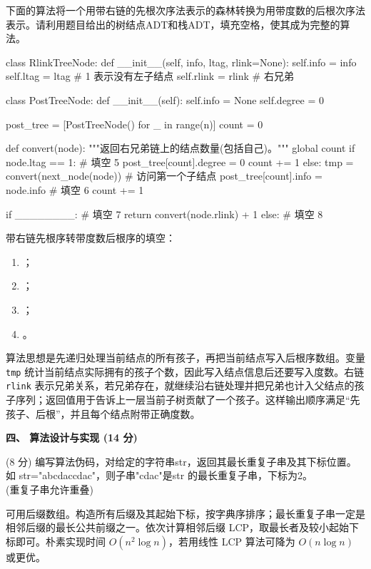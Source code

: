 \begin{question}
下面的算法将一个用带右链的先根次序法表示的森林转换为用带度数的后根次序法表示。请利用题目给出的树结点ADT和栈ADT，填充空格，使其成为完整的算法。\\
\begin{pycode}
class RlinkTreeNode:
    def __init__(self, info, ltag, rlink=None):
        self.info = info
        self.ltag = ltag       # 1 表示没有左子结点
        self.rlink = rlink     # 右兄弟


class PostTreeNode:
    def __init__(self):
        self.info = None
        self.degree = 0


post_tree = [PostTreeNode() for _ in range(n)]
count = 0


def convert(node):
    """返回右兄弟链上的结点数量(包括自己)。"""
    global count
    if node.ltag == 1:
        # 填空 5
        post_tree[count].degree = 0
        count += 1
    else:
        tmp = convert(next_node(node))   # 访问第一个子结点
        post_tree[count].info = node.info
        # 填空 6
        count += 1

    if ________:                         # 填空 7
        return convert(node.rlink) + 1
    else:
        # 填空 8
\end{pycode}
\begin{solution}
带右链先根序转带度数后根序的填空：
  \begin{enumerate}[leftmargin=2em]
    \item \texttt{}；
    \item \texttt{}；
    \item \texttt{}；
    \item \texttt{}。
  \end{enumerate}
算法思想是先递归处理当前结点的所有孩子，再把当前结点写入后根序数组。变量 \texttt{tmp} 统计当前结点实际拥有的孩子个数，因此写入结点信息后还要写入度数。右链 \texttt{rlink} 表示兄弟关系，若兄弟存在，就继续沿右链处理并把兄弟也计入父结点的孩子序列；返回值用于告诉上一层当前子树贡献了一个孩子。这样输出顺序满足“先孩子、后根”，并且每个结点附带正确度数。
\end{solution}
\end{question}

\textbf{四、 算法设计与实现 (14 分)}
\begin{question}
(8 分) 编写算法伪码，对给定的字符串str，返回其最长重复子串及其下标位置。如 str="abcdaccdac"，则子串"cdac"是str 的最长重复子串，下标为2。\\
(重复子串允许重叠)
\begin{solution}
可用后缀数组。构造所有后缀及其起始下标，按字典序排序；最长重复子串一定是相邻后缀的最长公共前缀之一。依次计算相邻后缀 LCP，取最长者及较小起始下标即可。朴素实现时间 $O(n^2\log n)$，若用线性 LCP 算法可降为 $O(n\log n)$ 或更优。
\end{solution}
\end{question}

